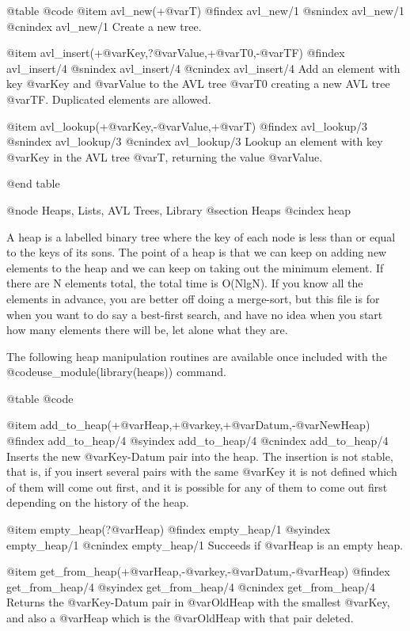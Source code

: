 {{{{{{{{{@table @code
@item avl_new(+@var{T})
@findex avl_new/1
@snindex avl_new/1
@cnindex avl_new/1
Create a new tree.

@item avl_insert(+@var{Key},?@var{Value},+@var{T0},-@var{TF})
@findex avl_insert/4
@snindex avl_insert/4
@cnindex avl_insert/4
Add an element with key @var{Key} and @var{Value} to the AVL tree
@var{T0} creating a new AVL tree @var{TF}. Duplicated elements are
allowed.

@item avl_lookup(+@var{Key},-@var{Value},+@var{T})
@findex avl_lookup/3
@snindex avl_lookup/3
@cnindex avl_lookup/3
Lookup an element with key @var{Key} in the AVL tree
@var{T}, returning the value @var{Value}.

@end table

@node Heaps, Lists, AVL Trees, Library
@section Heaps
@cindex heap

A heap is a labelled binary tree where the key of each node is less than
or equal to the keys of its sons.  The point of a heap is that we can
keep on adding new elements to the heap and we can keep on taking out
the minimum element.  If there are N elements total, the total time is
O(NlgN).  If you know all the elements in advance, you are better off
doing a merge-sort, but this file is for when you want to do say a
best-first search, and have no idea when you start how many elements
there will be, let alone what they are.

The following heap manipulation routines are available once included
with the @code{use_module(library(heaps))} command. 

@table @code

@item add_to_heap(+@var{Heap},+@var{key},+@var{Datum},-@var{NewHeap})
@findex add_to_heap/4
@syindex        add_to_heap/4
@cnindex        add_to_heap/4
Inserts the new @var{Key-Datum} pair into the heap. The insertion is not
stable, that is, if you insert several pairs with the same @var{Key} it
is not defined which of them will come out first, and it is possible for
any of them to come out first depending on the  history of the heap.

@item empty_heap(?@var{Heap})
@findex empty_heap/1
@syindex        empty_heap/1
@cnindex        empty_heap/1
Succeeds if @var{Heap} is an empty heap.

@item get_from_heap(+@var{Heap},-@var{key},-@var{Datum},-@var{Heap})
@findex get_from_heap/4
@syindex        get_from_heap/4
@cnindex        get_from_heap/4
Returns the @var{Key-Datum} pair in @var{OldHeap} with the smallest
@var{Key}, and also a @var{Heap} which is the @var{OldHeap} with that
pair deleted.

}}}}}}}}}
